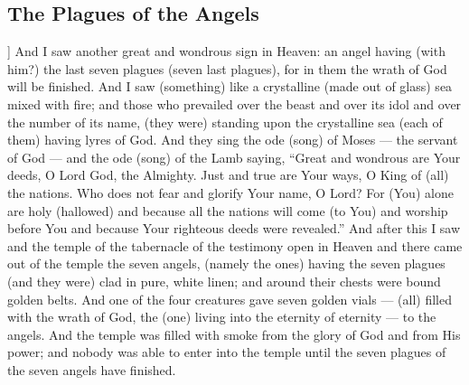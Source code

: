 \begin{pages}
\begin{Leftside}
        			\chapter{The Plagues of the Angels}
				]		
		And I saw another great and wondrous sign in Heaven: an angel having (with him?) the last seven plagues (seven last plagues), for in them the wrath of God will be finished. And I saw (something) like a crystalline (made out of glass) sea mixed with fire; and those who prevailed over the beast and over its idol and over the number of its name, (they were) standing upon the crystalline sea (each of them) having lyres of God. 
		\pend
		\pstart
		And they sing the ode (song) of Moses — the servant of God — and the ode (song) of the Lamb saying, “Great and wondrous are Your deeds, O Lord God, the Almighty. Just and true are Your ways, O King of (all) the nations. Who does not fear and glorify Your name, O Lord? For (You) alone are holy (hallowed) and because all the nations will come (to You) and worship before You and because Your righteous deeds were revealed.”
		\pend
		\pstart
		And after this I saw and the temple of the tabernacle of the testimony open in Heaven and there came out of the temple the seven angels, (namely the ones) having the seven plagues (and they were) clad in pure, white linen; and around their chests were bound golden belts. And one of the four creatures gave seven golden vials — (all) filled with the wrath of God, the (one) living into the eternity of eternity — to the angels. And the temple was filled with smoke from the glory of God and from His power; and nobody was able to enter into the temple until the seven plagues of the seven angels have finished. 
		\pend
        \endnumbering
    \end{Leftside}

\end{pages} 
\Pages

